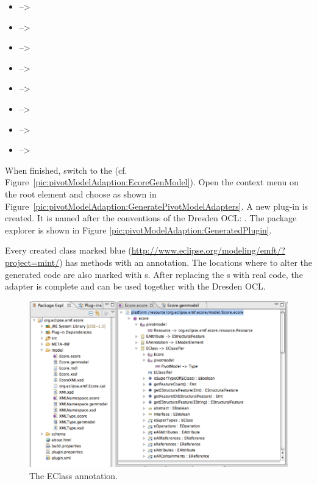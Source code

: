 \begin{itemize}
  \item {} --\textgreater {}
  \item {} --\textgreater {}
  \item {} --\textgreater {}
  \item {} --\textgreater {}
  \item {} --\textgreater {}
  \item {} --\textgreater {}
  \item {} --\textgreater {}
  \item {} --\textgreater {}
\end{itemize}

When finished, switch to the  (cf. 
Figure~\ref{pic:pivotModelAdaption:EcoreGenModel}). Open the context menu on 
the root element and choose  as shown in
Figure~\ref{pic:pivotModelAdaption:GeneratePivotModelAdapters}. A new plug-in 
is created. It is named after the conventions of the Dresden OCL:
. The package explorer is shown in Figure \ref{pic:pivotModelAdaption:GeneratedPlugin}.

Every created class marked blue 
(\url{http://www.eclipse.org/modeling/emft/?project=mint/}) has methods with an
 annotation. The locations where to alter the generated code 
are also marked with s. After replacing the s with real 
code, the adapter is complete and can be used together with the Dresden OCL.

\begin{figure}[!b]
	\centering
	\includegraphics[width=1.0\linewidth]{figures/pivotModelAdaption/EClassAnnotation}
	\caption{The EClass annotation.}
	\label{pic:pivotModelAdaption:EClassAnnotation}
\end{figure}


